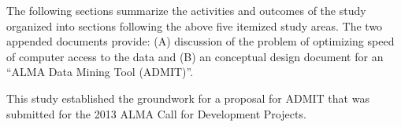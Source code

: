 The following sections summarize the activities and outcomes of the study
organized into sections following the above five itemized study areas.
The two appended documents provide: (A) discussion of the problem of optimizing
speed of computer access to the data and (B) an conceptual design document 
for an ``ALMA Data Mining Tool (ADMIT)''.  

This study established the groundwork for a proposal for ADMIT
that was submitted for the 2013 ALMA Call for Development Projects.

